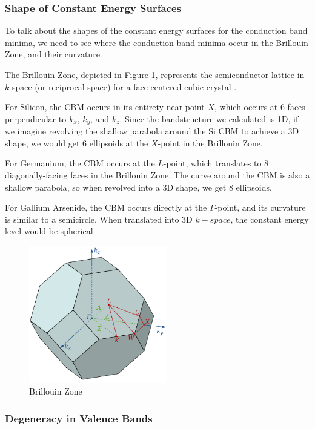 \documentclass{IEEEtran}
\begin{document}
\subsubsection{Shape of Constant Energy Surfaces}

To talk about the shapes of the constant energy surfaces for the conduction band minima, we need to see where the conduction band minima occur in the Brillouin Zone, and their curvature.

The Brillouin Zone, depicted in Figure \ref{fig:brillouin}, represents the semiconductor lattice in \(k\)-space (or reciprocal space) for a face-centered cubic crystal \cite{brillouin}.

For Silicon, the CBM occurs in its entirety near point \(X\), which occurs at 6 faces perpendicular to \(k_x\), \(k_y\), and \(k_z\). Since the bandstructure we calculated is 1D, if we imagine revolving the shallow parabola around the Si CBM to achieve a 3D shape, we would get 6 ellipsoids at the \(X\)-point in the Brillouin Zone. 

For Germanium, the CBM occurs at the \(L\)-point, which translates to 8 diagonally-facing faces in the Brillouin Zone. The curve around the CBM is also a shallow parabola, so when revolved into a 3D shape, we get 8 ellipsoids.

For Gallium Arsenide, the CBM occurs directly at the \(\Gamma\)-point, and its curvature is similar to a semicircle. When translated into 3D \(k-space\), the constant energy level would be spherical.

\begin{figure}[!ht] 
    \centering
    \includegraphics*[width = 6cm]{brillouinZone.png}
    \caption{Brillouin Zone}
    \label{fig:brillouin}
\end{figure}    


\subsubsection{Degeneracy in Valence Bands}
\end{document}
